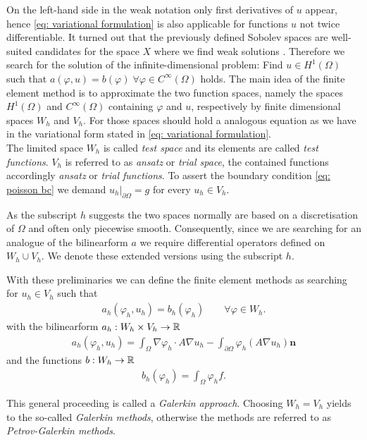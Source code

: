 \begin{definition} 
On the left-hand side in the weak notation only first derivatives of $u$ appear, hence \eqref{eq: variational formulation} is also applicable for functions $u$ not twice differentiable. It turned out that the previously defined Sobolev spaces are well-suited candidates for the space $X$ where we find weak solutions \cite[Chapter 1]{BS2002}. Therefore we search for the solution of the infinite-dimensional problem: Find $u\in H^1(\Omega)$ such that  $a(\varphi,u)  = b(\varphi) \;\forall \varphi \in C^\infty(\Omega)$ holds. %
The main idea of the finite element method is to approximate the two function spaces, namely the spaces $H^1(\Omega)$ and $C^\infty(\Omega)$ containing $\varphi$ and $u$, respectively by finite dimensional spaces $W_h$ and $V_h$. For those spaces should hold a analogous equation as we have in the variational form stated in \eqref{eq: variational formulation}.\\
The limited space $W_h$ is called \emph{test space} and its elements are called \emph{test functions}. $V_h$ is referred to as \emph{ansatz} or \emph{trial space}, the contained functions accordingly \emph{ansatz} or \emph{trial functions}. To assert the boundary condition \eqref{eq: poisson bc} we demand $u_h|_{\partial \Omega} = g$ for every $u_h \in V_h$.

As the subscript $h$ suggests the two spaces normally are based on a discretisation of $\Omega$ and often only piecewise smooth. Consequently, since we are searching for an analogue of the bilinearform $a$ we require differential operators defined on $W_h \cup V_h$. We denote these extended versions using the subscript $h$.

With these preliminaries we can define the finite element methods as searching for $u_h \in V_h$ such that 
\begin{align}
a_h(\varphi_h,u_h) = b_h(\varphi_h) \qquad \forall \varphi \in W_h. \label{eq: FE variational formulation}
\end{align}
with the bilinearform  $a_h:W_h \times V_h \rightarrow \mathbb{R}$
\begin{align*}
a_h(\varphi_h,u_h)  = \int_\Omega \nabla \varphi_h  \cdot A\nabla u_h -\int_{\partial \Omega} \varphi_h (A\nabla u_h) \mathbf{n}
\end{align*}
and the functions $b:W_h \rightarrow \mathbb{R}$
\begin{align*}
b_h(\varphi_h) = \int_\Omega \varphi_h f.
\end{align*}

This general proceeding is called a \emph{Galerkin approach}. Choosing $W_h = V_h$ yields to the so-called \emph{Galerkin methods}, otherwise the methods are referred to as \emph{Petrov-Galerkin methods}.


\end{definition}
